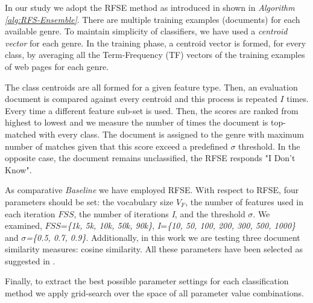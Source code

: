 In our study we adopt the RFSE method as introduced in \citep{pritsos2013open} shown in \textit{Algorithm \ref{alg:RFS-Ensemble}}. There are multiple training examples (documents) for each available genre. To maintain simplicity of classifiers, we have used a \textit{centroid vector} for each genre. In the training phase, a centroid vector is formed, for every class, by averaging all the Term-Frequency (TF) vectors  of the training examples of web pages for each genre.

The class centroids are all formed for a given feature type. Then, an evaluation document is compared against every centroid and this process is repeated $I$ times. Every time a different feature sub-set is used. Then, the scores are ranked from highest to lowest and we measure the number of times the document is top-matched with every class. The document is assigned to the genre with maximum number of matches given that this score exceed a predefined $\sigma$ threshold. In the opposite case, the document remains unclassified, the RFSE responds "I Don't Know".

As comparative \textit{Baseline} we have employed RFSE. With respect to RFSE, four parameters should be set: the vocabulary size $V_{F}$, the number of features used in each iteration $FSS$, the number of iterations \textit{I}, and the threshold $\sigma$. We examined, $FSS$=\textit{\{1k, 5k, 10k, 50k, 90k\}}, \textit{I}=\textit{\{10, 50, 100, 200, 300, 500, 1000\}} and $\sigma$\textit{=\{0.5, 0.7, 0.9\}}. Additionally, in this work we are testing three document similarity measures: cosine similarity. All these parameters have been selected as suggested in \cite{pritsos2018open}.

Finally, to extract the best possible parameter settings for each classification method we apply grid-search over the space of all parameter value combinations.

